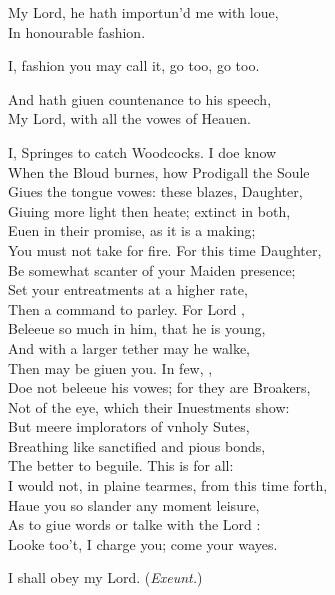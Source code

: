 \documentclass[a5paper,DIV=calc,11pt]{scrbook}
\newcommand{\updatemarks}{\markboth{Act \Roman{act}}{Scene \Roman{act}--\Roman{scene}}}
\begin{document}
\begin{drama*}
    \ophespeaks My Lord, he hath importun'd me with loue,\\
    In honourable fashion.
    
    \polspeaks I, fashion you may call it, go too, go too.
    
    \ophespeaks And hath giuen countenance to his speech,\\
    My Lord, with all the vowes of Heauen.
    
    \polspeaks I, Springes to catch Woodcocks. I doe know\\
    When the Bloud burnes, how Prodigall the Soule\\
    Giues the tongue vowes: these blazes, Daughter,\\
    Giuing more light then heate; extinct in both,\\
    Euen in their promise, as it is a making;\\
    You must not take for fire. For this time Daughter,\\
    Be somewhat scanter of your Maiden presence;\\
    Set your entreatments at a higher rate,\\
    Then a command to parley. For Lord \ham,\\
    Beleeue so much in him, that he is young,\\
    And with a larger tether may he walke,\\
    Then may be giuen you. In few, \ophe,\\
    Doe not beleeue his vowes; for they are Broakers,\\
    Not of the eye, which their Inuestments show:\\
    But meere implorators of vnholy Sutes,\\
    Breathing like sanctified and pious bonds,\\
    The better to beguile. This is for all:\\
    I would not, in plaine tearmes, from this time forth,\\
    Haue you so slander any moment leisure,\\
    As to giue words or talke with the Lord \ham:\\
    Looke too't, I charge you; come your wayes.
    
    \ophespeaks I shall obey my Lord. \hfill(\textit{Exeunt.})
\end{drama*}

\scene

\updatemarks
\end{document}
